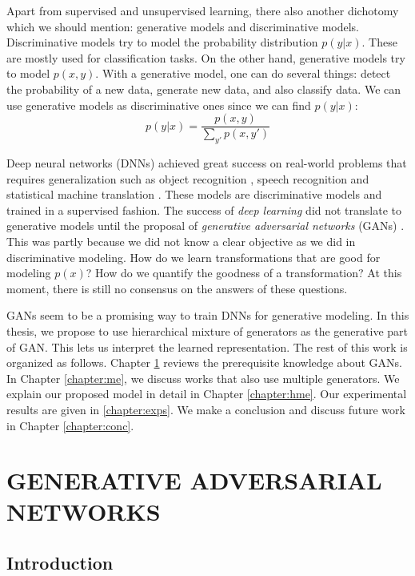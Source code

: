 \documentclass[a4paper,onesided,12pt]{report}
\begin{document}
Apart from supervised and unsupervised learning, there also another dichotomy which we should mention: generative models and discriminative models. Discriminative models try to model the probability distribution $p(y|x)$. These are mostly used for classification tasks. On the other hand, generative models try to model $p(x, y)$. With a generative model, one can do several things: detect the probability of a new data, generate new data, and also classify data. We can use generative models as discriminative ones since we can find $p(y|x)$:
\begin{equation}
p(y|x) = \frac{p(x, y)}{\sum_{y'} p(x, y')}
\end{equation}

Deep neural networks (DNNs) achieved great success on real-world problems that requires generalization such as object recognition \cite{alexnet}, speech recognition \cite{acoustic} and statistical machine translation \cite{seq2seq}. These models are discriminative models and trained in a supervised fashion. The success of \emph{deep learning} did not translate to generative models until the proposal of \emph{generative adversarial networks} (GANs) \cite{gan}. This was partly because we did not know a clear objective as we did in discriminative modeling. How do we learn transformations that are good for modeling $p(x)$? How do we quantify the goodness of a transformation? At this moment, there is still no consensus on the answers of these questions.

GANs seem to be a promising way to train DNNs for generative modeling. In this thesis, we propose to use hierarchical mixture of generators as the generative part of GAN. This lets us interpret the learned representation. The rest of this work is organized as follows. Chapter \ref{chapter:gan} reviews the prerequisite knowledge about GANs. In Chapter \ref{chapter:me}, we discuss works that also use multiple generators. We explain our proposed model in detail in Chapter \ref{chapter:hme}. Our experimental results are given in \ref{chapter:exps}. We make a conclusion and discuss future work in Chapter \ref{chapter:conc}.

\chapter{GENERATIVE ADVERSARIAL NETWORKS}
\label{chapter:gan}

\section{Introduction}
\label{sec:gan:intro}
\end{document}
